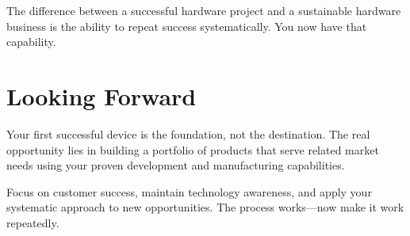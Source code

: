 The difference between a successful hardware project and a sustainable hardware business is the ability to repeat success systematically. You now have that capability.

\section{Looking Forward}

Your first successful device is the foundation, not the destination. The real opportunity lies in building a portfolio of products that serve related market needs using your proven development and manufacturing capabilities.

Focus on customer success, maintain technology awareness, and apply your systematic approach to new opportunities. The process works—now make it work repeatedly.